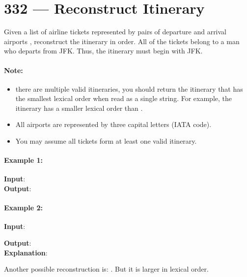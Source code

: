 \section{332 --- Reconstruct Itinerary}
Given a list of airline tickets represented by pairs of departure and arrival airports \fcj{[from, to]}, reconstruct the itinerary in order. All of the tickets belong to a man who departs from JFK. Thus, the itinerary must begin with JFK.

\paragraph{Note:}
\begin{itemize}
\item  there are multiple valid itineraries, you should return the itinerary that has the smallest lexical order when read as a single string. For example, the itinerary  has a smaller lexical order than .
\item All airports are represented by three capital letters (IATA code).
\item You may assume all tickets form at least one valid itinerary.
\end{itemize}

\paragraph{Example 1:}

\begin{flushleft}
\textbf{Input}:  
\\
\textbf{Output}: 

\end{flushleft}

\paragraph{Example 2:}

\begin{flushleft}
\textbf{Input}: 

\textbf{Output}: 
\\
\textbf{Explanation}: 

Another possible reconstruction is: . But it is larger in lexical order.
\end{flushleft}
